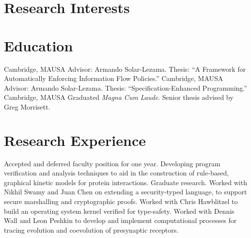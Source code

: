 \documentclass[10pt,a4paper]{moderncv}
\begin{document}
\maketitle

\section{Research Interests}

\section{Education}
  {Cambridge, MA}{USA}
    {Advisor: Armando Solar-Lezama. Thesis: ``A Framework for Automatically Enforcing Information Flow Policies.''}
  {Cambridge, MA}{USA}
  {Advisor: Armando Solar-Lezama. Thesis: ``Specification-Enhanced Programming.''}
  {Cambridge, MA}{USA}
  {Graduated \emph{Magna Cum Laude}. Senior thesis advised by Greg Morrisett.}

\section{Research Experience}
  {Accepted and deferred faculty position for one year.}
  {Developing program verification and analysis techniques to aid in the construction of rule-based, graphical kinetic models for protein interactions.}
  {Graduate research.}
  {Worked with Nikhil Swamy and Juan Chen on extending a security-typed language, to support secure marshalling and cryptographic proofs.}
  {Worked with Chris Hawblitzel to build an operating system kernel verified for type-safety.}
  {Worked with Dennis Wall and Leon Peshkin to develop and implement computational processes for tracing evolution and coevolution of presynaptic receptors.}
\end{document}
